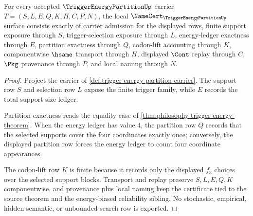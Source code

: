 \begin{theorem}
\label{thm:trigger-energy-partition-namecert-obligations}
For every accepted $\TriggerEnergyPartitionUp$ carrier $T=(S,L,E,Q,K,H,C,P,N)$, the local $\NameCert_{\TriggerEnergyPartitionUp}$ surface consists exactly of carrier admission for the displayed rows, finite support exposure through $S$, trigger-selection exposure through $L$, energy-ledger exactness through $E$, partition exactness through $Q$, codon-lift accounting through $K$, componentwise $\hsame$ transport through $H$, displayed $\Cont$ replay through $C$, $\Pkg$ provenance through $P$, and local naming through $N$.
\end{theorem}
\begin{proof}
Project the carrier of \autoref{def:trigger-energy-partition-carrier}. The support row $S$ and selection row $L$ expose the finite trigger family, while $E$ records the total support-size ledger.

Partition exactness reads the equality case of \autoref{thm:philosophy-trigger-energy-theorem}. When the energy ledger has value $4$, the partition row $Q$ records that the selected supports cover the four coordinates exactly once; conversely, the displayed partition row forces the energy ledger to count four coordinate appearances.

The codon-lift row $K$ is finite because it records only the displayed $f_{3}$ choices over the selected support blocks. Transport and replay preserve $S,L,E,Q,K$ componentwise, and provenance plus local naming keep the certificate tied to the source theorem and the energy-biased reliability sibling. No stochastic, empirical, hidden-semantic, or unbounded-search row is exported.
\end{proof}

